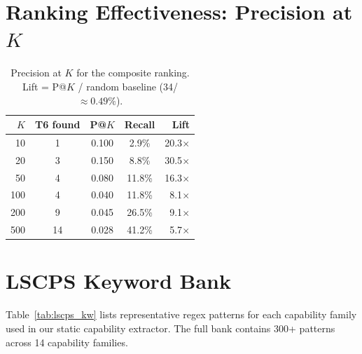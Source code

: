 
\section{Ranking Effectiveness: Precision at $K$}
\label{app:patk}

\begin{table}[h]
\centering
\caption{Precision at $K$ for the composite ranking.
  Lift = P@$K$ / random baseline (34/\NskillsDMR{} $\approx0.49\%$).}
\label{tab:patk}
\small
\begin{tabular}{@{}rcccr@{}}
\toprule
\textbf{$K$} & \textbf{T6 found} & \textbf{P@$K$} & \textbf{Recall} & \textbf{Lift} \\
\midrule
 10 & 1  & 0.100 & 2.9\%  & 20.3$\times$ \\
 20 & 3  & 0.150 & 8.8\%  & 30.5$\times$ \\
 50 & 4  & 0.080 & 11.8\% & 16.3$\times$ \\
100 & 4  & 0.040 & 11.8\% & 8.1$\times$ \\
200 & 9  & 0.045 & 26.5\% & 9.1$\times$ \\
500 & 14 & 0.028 & 41.2\% & 5.7$\times$ \\
\bottomrule
\end{tabular}
\end{table}

\section{LSCPS Keyword Bank}
\label{app:lscps}

Table~\ref{tab:lscps_kw} lists representative regex patterns for each
\lscps{} capability family used in our static capability extractor.
The full bank contains 300+ patterns across 14 capability families.

